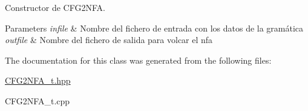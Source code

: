 Constructor de C\+F\+G2\+N\+FA. 


\begin{DoxyParams}{Parameters}
{\em infile} & Nombre del fichero de entrada con los datos de la gramática \\
\hline
{\em outfile} & Nombre del fichero de salida para volcar el nfa \\
\hline
\end{DoxyParams}


The documentation for this class was generated from the following files\+:\begin{DoxyCompactItemize}
\item 
\hyperlink{CFG2NFA__t_8hpp}{C\+F\+G2\+N\+F\+A\+\_\+t.\+hpp}\item 
C\+F\+G2\+N\+F\+A\+\_\+t.\+cpp\end{DoxyCompactItemize}
